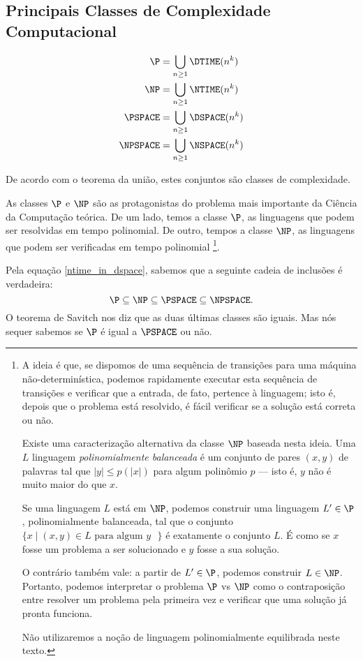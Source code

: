 \subsection{Principais Classes de Complexidade Computacional}
\label{classes_complexidade}

\begin{definition}
    \begin{align*}
        \P &= \bigcup_{n \geq 1} \DTIME(n^k) \\
        \NP &= \bigcup_{n \geq 1} \NTIME(n^k) \\
        \PSPACE &= \bigcup_{n \geq 1} \DSPACE(n^k) \\
        \NPSPACE &= \bigcup_{n \geq 1} \NSPACE(n^k) \\
    \end{align*}
\end{definition}

De acordo com o teorema da união,
estes conjuntos são classes de complexidade.

As classes $\P$ e $\NP$ são as protagonistas
do problema mais importante da Ciência da Computação teórica.
De um lado, temos a classe $\P$,
as linguagens que podem ser resolvidas em tempo polinomial.
De outro, tempos a classe $\NP$,
as linguagens que podem ser verificadas em tempo polinomial%
\footnote{
    A ideia é que,
    se dispomos de uma sequência de transições para uma máquina não-determinística,
    podemos rapidamente executar esta sequência de transições
    e verificar que a entrada, de fato, pertence à linguagem;
    isto é, depois que o problema está resolvido,
    é fácil verificar se a solução está correta ou não.

    Existe uma caracterização alternativa da classe $\NP$ baseada nesta ideia.
    Uma $L$ linguagem \emph{polinomialmente balanceada}
    é um conjunto de pares $(x, y)$ de palavras
    tal que $|y| \leq p(|x|)$ para algum polinômio $p$
    \cite[p. 298]{Papadimitriou1998}
    --- isto é, $y$ não é muito maior do que $x$.

    Se uma linguagem $L$ está em $\NP$,
    podemos construir uma linguagem $L' \in \P$,
    polinomialmente balanceada,
    tal que o conjunto $\{x \mid (x, y) \in L \text{ para algum $y$ }\}$
    é exatamente o conjunto $L$.
    É como se $x$ fosse um problema a ser solucionado
    e $y$ fosse a sua solução.

    O contrário também vale: a partir de $L' \in \P$,
    podemos construir $L \in \NP$.
    Portanto, podemos interpretar o problema $\P$ vs $\NP$
    como o contraposição entre resolver um problema pela primeira vez
    e verificar que uma solução já pronta funciona.

    Não utilizaremos a noção de linguagem polinomialmente equilibrada neste texto.
}.

Pela equação \ref{ntime_in_dspace},
sabemos que a seguinte cadeia de inclusões é verdadeira:
\begin{equation*}
    \P \subseteq \NP \subseteq \PSPACE \subseteq \NPSPACE.
\end{equation*}
O teorema de Savitch nos diz que as duas últimas classes são iguais.
Mas nós sequer sabemos se $\P$ é igual a $\PSPACE$ ou não.

